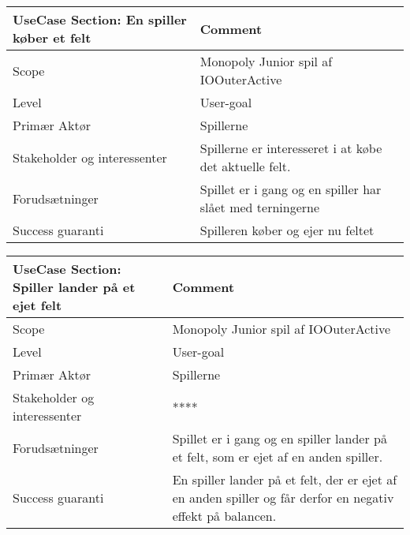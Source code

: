 \begin{center}
\begin{tabular}{ | m{10em} | m{10cm}| }
        \hline
            UseCase Section: En spiller køber et felt & Comment\\
        \hline
            Scope & Monopoly Junior spil af IOOuterActive\\
        \hline
            Level & User-goal\\
        \hline
            Primær Aktør & Spillerne\\
        \hline
            Stakeholder og interessenter & Spillerne er interesseret i at købe det aktuelle felt.\\
        \hline
            Forudsætninger & Spillet er i gang og en spiller har slået med terningerne\\
        \hline
            Success guaranti & Spilleren køber og ejer nu feltet\\
        \hline
    \end{tabular}
\end{center}

\begin{center}
\begin{tabular}{ | m{10em} | m{10cm}| }
        \hline
            UseCase Section: Spiller lander på et ejet felt & Comment\\
        \hline
            Scope & Monopoly Junior spil af IOOuterActive\\
        \hline
            Level & User-goal\\
        \hline
            Primær Aktør & Spillerne\\
        \hline
            Stakeholder og interessenter & ****\\
        \hline
            Forudsætninger & Spillet er i gang og en spiller lander på et felt, som er ejet af en anden spiller.\\
        \hline
            Success guaranti & En spiller lander på et felt, der er ejet af en anden spiller og får derfor en negativ effekt på balancen.\\
        \hline
    \end{tabular}
\end{center}

